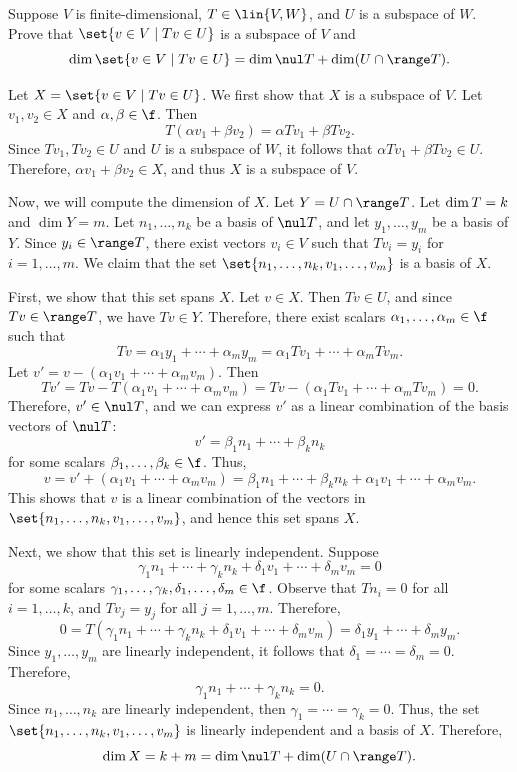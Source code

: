 \begin{exercise}[3b21]
    Suppose $V$ is finite-dimensional, $T \in \lin{V, W}$, and $U$ is a subspace of $W$. Prove that $\set{v \in V \mid Tv \in U}$ is a subspace of $V$ and
    \[\dim\set{v \in V \mid Tv \in U} = \dim \nul T + \dim(U \cap \range T).\]
\end{exercise}

\begin{sol}
    Let $X = \set{v \in V \mid Tv \in U}$. We first show that $X$ is a subspace of $V$. Let $v_1, v_2 \in X$ and $\alpha, \beta \in \f$. Then
    \[T(\alpha v_1 + \beta v_2) = \alpha Tv_1 + \beta Tv_2.\]
    Since $Tv_1, Tv_2 \in U$ and $U$ is a subspace of $W$, it follows that $\alpha Tv_1 + \beta Tv_2 \in U$. Therefore, $\alpha v_1 + \beta v_2 \in X$, and thus $X$ is a subspace of $V$.

    Now, we will compute the dimension of $X$. Let $Y = U \cap \range T$. Let $\dim \null T = k$ and $\dim Y = m$. Let $n_1, \ldots, n_k$ be a basis of $\nul T$, and let $y_1, \ldots, y_m$ be a basis of $Y$. Since $y_i \in \range T$, there exist vectors $v_i \in V$ such that $Tv_i = y_i$ for $i = 1, \ldots, m$. We claim that the set $\set{n_1, \ldots, n_k, v_1, \ldots, v_m}$ is a basis of $X$.

    First, we show that this set spans $X$. Let $v \in X$. Then $Tv \in U$, and since $Tv \in \range T$, we have $Tv \in Y$. Therefore, there exist scalars $\alpha_1, \ldots, \alpha_m \in \f$ such that
    \[Tv = \alpha_1 y_1 + \cdots + \alpha_m y_m = \alpha_1 Tv_1 + \cdots + \alpha_m Tv_m.\]
    Let $v' = v - (\alpha_1 v_1 + \cdots + \alpha_m v_m)$. Then
    \[Tv' = Tv - T(\alpha_1 v_1 + \cdots + \alpha_m v_m) = Tv - (\alpha_1 Tv_1 + \cdots + \alpha_m Tv_m) = 0.\]
    Therefore, $v' \in \nul T$, and we can express $v'$ as a linear combination of the basis vectors of $\nul T$:
    \[v' = \beta_1 n_1 + \cdots + \beta_k n_k\]
    for some scalars $\beta_1, \ldots, \beta_k \in \f$. Thus,
    \[v = v' + (\alpha_1 v_1 + \cdots + \alpha_m v_m) = \beta_1 n_1 + \cdots + \beta_k n_k + \alpha_1 v_1 + \cdots + \alpha_m v_m.\]
    This shows that $v$ is a linear combination of the vectors in $\set{n_1, \ldots, n_k, v_1, \ldots, v_m}$, and hence this set spans $X$.

    Next, we show that this set is linearly independent. Suppose
    \[\gamma_1 n_1 + \cdots + \gamma_k n_k + \delta_1 v_1 + \cdots + \delta_m v_m = 0\]
    for some scalars $\gamma_1, \ldots, \gamma_k, \delta_1, \ldots, \delta_m \in \f$. Observe that $Tn_i = 0$ for all $i = 1, \ldots, k$, and $Tv_j = y_j$ for all $j = 1, \ldots, m$. Therefore,
    \[0 = T(\gamma_1 n_1 + \cdots + \gamma_k n_k + \delta_1 v_1 + \cdots + \delta_m v_m) = \delta_1 y_1 + \cdots + \delta_m y_m.\]
    Since $y_1, \ldots, y_m$ are linearly independent, it follows that $\delta_1 = \cdots = \delta_m = 0$. Therefore,
    \[\gamma_1 n_1 + \cdots + \gamma_k n_k = 0.\]
    Since $n_1, \ldots, n_k$ are linearly independent, then $\gamma_1 = \cdots = \gamma_k = 0$. Thus, the set $\set{n_1, \ldots, n_k, v_1, \ldots, v_m}$ is linearly independent and a basis of $X$. Therefore,
    \[\dim X = k + m = \dim \nul T + \dim(U \cap \range T).\]
\end{sol}

